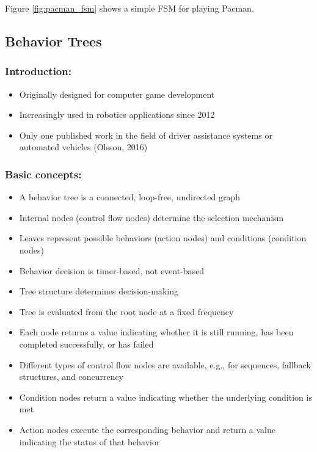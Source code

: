Figure \ref{fig:pacman_fsm} shows a simple FSM for playing Pacman.

\subsection{Behavior Trees}

\subsubsection*{Introduction:}
\begin{itemize}
    \item Originally designed for computer game development
    \item Increasingly used in robotics applications since 2012
    \item Only one published work in the field of driver assistance systems or automated vehicles (Olsson, 2016)
\end{itemize}

\subsubsection*{Basic concepts:}
\begin{itemize}
    \item A behavior tree is a connected, loop-free, undirected graph
    \item Internal nodes (control flow nodes) determine the selection mechanism
    \item Leaves represent possible behaviors (action nodes) and conditions (condition nodes)
    \item Behavior decision is timer-based, not event-based
    \item Tree structure determines decision-making
    \item Tree is evaluated from the root node at a fixed frequency
    \item Each node returns a value indicating whether it is still running, has been completed successfully, or has failed
    \item Different types of control flow nodes are available, e.g., for sequences, fallback structures, and concurrency
    \item Condition nodes return a value indicating whether the underlying condition is met
    \item Action nodes execute the corresponding behavior and return a value indicating the status of that behavior
\end{itemize}


